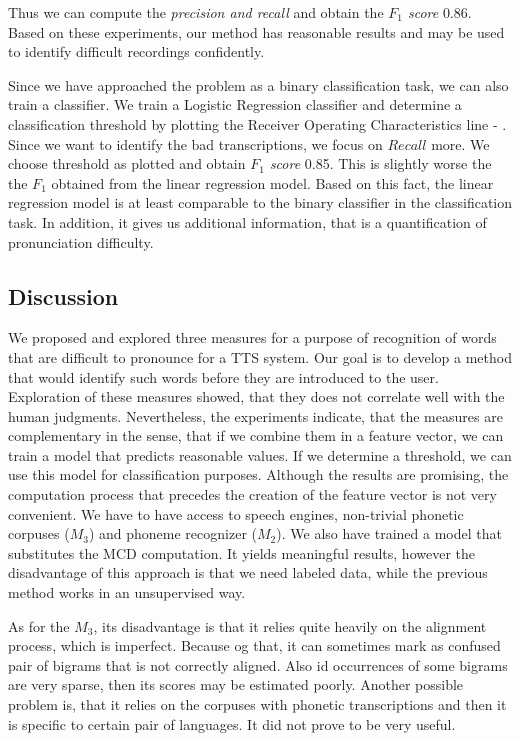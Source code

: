 \par
Thus we can compute the \textit{precision and recall} and obtain the \textit{$F_1$ score} 0.86.
Based on these experiments, our method has reasonable results and may be used to identify difficult recordings confidently.
\par
Since we have approached the problem as a binary classification task, we can also train a classifier.
We train a Logistic Regression classifier and determine a classification threshold by plotting the Receiver Operating Characteristics line - .
Since we want to identify the bad transcriptions, we focus on $Recall$ more.
We choose threshold as plotted and obtain \textit{$F_1$ score} 0.85.
This is slightly worse the the \textit{$F_1$} obtained from the linear regression model.
Based on this fact, the linear regression model is at least comparable to the binary classifier in the classification task.
In addition, it gives us additional information, that is a quantification of pronunciation difficulty.
\subsection{Discussion}
We proposed and explored three measures for a purpose of recognition of words that are difficult to pronounce for a TTS system.
Our goal is to develop a method that would identify such words before they are introduced to the user.
Exploration of these measures showed, that they does not correlate well with the human judgments.
Nevertheless, the experiments indicate, that the measures are complementary in the sense, that if we combine them in a feature vector, we can train a model that predicts reasonable values.
If we determine a threshold, we can use this model for classification purposes.
Although the results are promising, the computation process that precedes the creation of the feature vector is not very convenient.
We have to have access to speech engines, non-trivial phonetic corpuses ($M_3$) and phoneme recognizer ($M_2$).
We also have trained a model that substitutes the MCD computation.
It yields meaningful results, however the disadvantage of this approach is that we need labeled data, while the previous method works in an unsupervised way.
\par
As for the $M_3$, its disadvantage is that it relies quite heavily on the alignment process, which is imperfect.
Because og that, it can sometimes mark as confused pair of bigrams that is not correctly aligned.
Also id occurrences of some bigrams are very sparse, then its scores may be estimated poorly.
Another possible problem is, that it relies on the corpuses with phonetic transcriptions and then it is specific to certain pair of languages.
It did not prove to be very useful.
